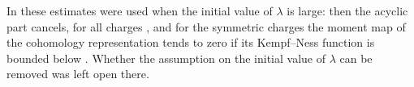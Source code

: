 In \cite{wue26} these estimates were used when the initial value of
$\lambda$ is large: then the acyclic part cancels, for all charges
\cite[Theorem~1.3]{wue26}, and for the symmetric charges the moment map of
the cohomology representation tends to zero if its Kempf--Ness function is
bounded below \cite[Theorem~1.4]{wue26}. Whether the assumption on the
initial value of $\lambda$ can be removed was left open there.

